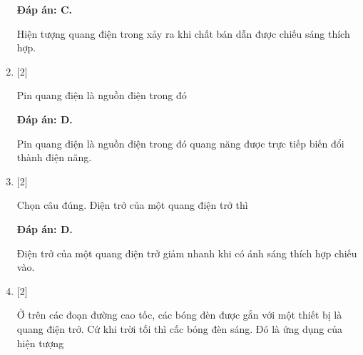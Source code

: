 \begin{enumerate}[label=\bfseries Câu \arabic*:]
	\loigiai
	{		\textbf{Đáp án: C.}
		
		Hiện tượng quang điện trong xảy ra khi chất bán dẫn được chiếu sáng thích hợp.
	}
	
	\item {} [2]
	\cauhoi
	{Pin quang điện là nguồn điện trong đó
	}
	
	\loigiai
	{		\textbf{Đáp án: D.}
		
		Pin quang điện là nguồn điện trong đó quang năng được trực tiếp biến đổi thành điện năng.
	}
	
	\item {} [2]
	\cauhoi
	{Chọn câu đúng. Điện trở của một quang điện trở thì
	}
	
	\loigiai
	{		\textbf{Đáp án: D.}
		
		Điện trở của một quang điện trở giảm nhanh khi có ánh sáng thích hợp chiếu vào.
	}
	
	\item {} [2]
	\cauhoi
	{Ở trên các đoạn đường cao tốc, các bóng đèn được gắn với một thiết bị là quang điện trở. Cứ khi trời tối thì cấc bóng đèn sáng. Đó là ứng dụng của hiện tượng
	}
	

\end{enumerate}

